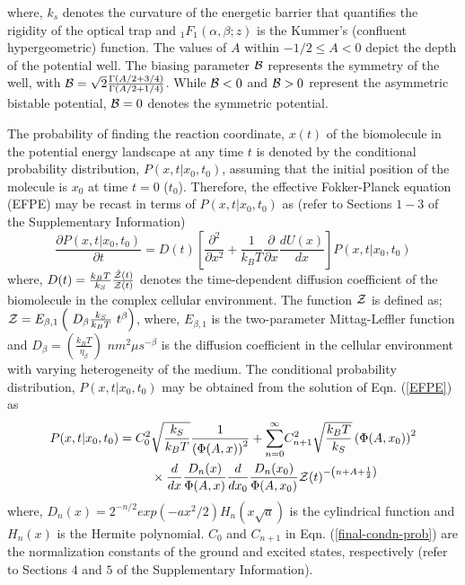 \documentclass[twoside,twocolumn,9pt]{article}
\begin{document}
where, $k_{s}$ denotes the curvature of the energetic barrier that quantifies the rigidity 
of the optical trap and ${_1}F_{1}(\alpha,\beta;z)$ is the Kummer's (confluent hypergeometric) function.
The values of $A$ within $-1/2\leq A<0$ depict the depth of the potential well. The biasing parameter ${\cal{B}}$
represents the symmetry of the well, with ${\cal{B}} = \sqrt{2} \frac{\Gamma(A/2+3/4)}{\Gamma(A/2+1/4)}$.
While ${\cal{B}}<0$ and ${\cal{B}}>0$ represent the asymmetric bistable potential, ${\cal{B}}=0$ denotes 
the symmetric potential.

The probability of finding the reaction coordinate, $x(t)$ of the biomolecule in the potential energy landscape 
at any time $t$
is denoted by the conditional probability distribution, $P(x,t|x_{0},t_{0})$, assuming that the initial position of 
the molecule is $x_{0}$ at time $t=0$ ($t_{0}$). Therefore, the effective Fokker-Planck equation (EFPE) may be recast 
in terms of $P(x,t|x_{0},t_{0})$ as (refer to Sections $1-3$ of the Supplementary Information)
\begin{equation}
\frac{\partial P(x,t|x_{0},t_{0})}{\partial t}=D(t)\left[{\frac{\partial^2 }{\partial x^2}} 
			+\frac{1}{k_{B}T}{\frac{\partial }{\partial x}\frac{dU(x)}{dx}}\right] P(x,t|x_{0},t_{0})
\label{EFPE}
\end{equation} 
where, $D(t)=\frac{k_BT}{k_S} \frac{\dot{{\cal{Z}}}{(t)}}{{{\cal{Z}}}{(t)}}$ denotes the time-dependent diffusion 
coefficient of the biomolecule in the complex cellular environment. The function ${\cal{Z}}$ is defined as; 
${\cal{Z}}=E_{\beta,1}\left(\ D_\beta \frac{k_S }{k_BT} \ t^{\beta}\right)$, where, $E_{\beta,1}$ is the 
two-parameter Mittag-Leffler function and $D_{\beta}=\left(\frac{k_{B}T}{\eta_{\beta}}\right)$ ${nm}^2{\mu s}^{-\beta}$ 
is the diffusion coefficient in the cellular environment with varying heterogeneity of the medium. The conditional 
probability distribution, $P(x,t|x_{0},t_{0})$ may be obtained from the solution of Eqn. (\ref{EFPE}) as
\begin{equation}
\begin{split}
P(x,t|x_{0},t_{0})={C_{0}^2}&\sqrt{\frac{k_{S}}{k_{B}T}}{\frac{1}{\left(\Phi{(A,x)}\right)^2}} 
			+{\sum_{n=0}^{\infty}} C_{n+1}^2 \sqrt{\frac{k_{B}T}{k_{S}}} \left(\Phi{(A,x_0)}\right)^2\\ 
			&\times\frac{d}{dx}\frac{D_{n}(x)}{\Phi(A,x)}\frac{d}{dx_{0}}\frac{D_{n}(x_{0})}{\Phi(A,x_{0})}
					{{\cal{Z}}}{(t)}^{-\left(n+A+\frac{1}{2}\right)}
\label{final-condn-prob}
\end{split}
\end{equation}
where, $D_n{(x)} = 2^{-n/2}exp\left(-ax^2 /2 \right) H_{n}{(x\sqrt{a})}$ is the cylindrical function and $H_{n}(x)$ 
is the Hermite polynomial. $C_{0}$ and $C_{n+1}$ in Eqn. (\ref{final-condn-prob}) are the normalization constants 
of the ground and excited states, respectively (refer to Sections $4$ and $5$ of the Supplementary Information).
\end{document}

